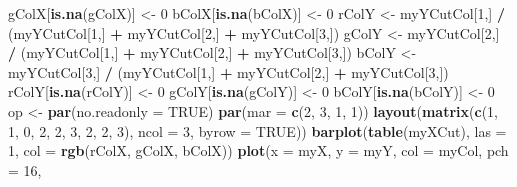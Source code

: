 \documentclass[]{book}
\newenvironment{Shaded}{\begin{snugshade}}{\end{snugshade}}
\newcommand{\KeywordTok}[1]{\textcolor[rgb]{0.13,0.29,0.53}{\textbf{#1}}}
\newcommand{\DataTypeTok}[1]{\textcolor[rgb]{0.13,0.29,0.53}{#1}}
\newcommand{\DecValTok}[1]{\textcolor[rgb]{0.00,0.00,0.81}{#1}}
\newcommand{\StringTok}[1]{\textcolor[rgb]{0.31,0.60,0.02}{#1}}
\newcommand{\OtherTok}[1]{\textcolor[rgb]{0.56,0.35,0.01}{#1}}
\newcommand{\OperatorTok}[1]{\textcolor[rgb]{0.81,0.36,0.00}{\textbf{#1}}}
\newcommand{\NormalTok}[1]{#1}
\theoremstyle{definition}
\theoremstyle{definition}
\theoremstyle{definition}
\theoremstyle{remark}
\begin{document}
\begin{Shaded}
\begin{Highlighting}[]
\NormalTok{  gColX[}\KeywordTok{is.na}\NormalTok{(gColX)] <-}\StringTok{ }\DecValTok{0}
\NormalTok{  bColX[}\KeywordTok{is.na}\NormalTok{(bColX)] <-}\StringTok{ }\DecValTok{0}
\NormalTok{  rColY <-}\StringTok{ }\NormalTok{myYCutCol[}\DecValTok{1}\NormalTok{,] }\OperatorTok{/}\StringTok{ }\NormalTok{(myYCutCol[}\DecValTok{1}\NormalTok{,] }\OperatorTok{+}\StringTok{ }\NormalTok{myYCutCol[}\DecValTok{2}\NormalTok{,] }\OperatorTok{+}\StringTok{ }
\StringTok{    }\NormalTok{myYCutCol[}\DecValTok{3}\NormalTok{,])}
\NormalTok{  gColY <-}\StringTok{ }\NormalTok{myYCutCol[}\DecValTok{2}\NormalTok{,] }\OperatorTok{/}\StringTok{ }\NormalTok{(myYCutCol[}\DecValTok{1}\NormalTok{,] }\OperatorTok{+}\StringTok{ }\NormalTok{myYCutCol[}\DecValTok{2}\NormalTok{,] }\OperatorTok{+}\StringTok{ }
\StringTok{    }\NormalTok{myYCutCol[}\DecValTok{3}\NormalTok{,])}
\NormalTok{  bColY <-}\StringTok{ }\NormalTok{myYCutCol[}\DecValTok{3}\NormalTok{,] }\OperatorTok{/}\StringTok{ }\NormalTok{(myYCutCol[}\DecValTok{1}\NormalTok{,] }\OperatorTok{+}\StringTok{ }\NormalTok{myYCutCol[}\DecValTok{2}\NormalTok{,] }\OperatorTok{+}\StringTok{ }
\StringTok{    }\NormalTok{myYCutCol[}\DecValTok{3}\NormalTok{,])}
\NormalTok{  rColY[}\KeywordTok{is.na}\NormalTok{(rColY)] <-}\StringTok{ }\DecValTok{0}
\NormalTok{  gColY[}\KeywordTok{is.na}\NormalTok{(gColY)] <-}\StringTok{ }\DecValTok{0}
\NormalTok{  bColY[}\KeywordTok{is.na}\NormalTok{(bColY)] <-}\StringTok{ }\DecValTok{0}
\NormalTok{  op <-}\StringTok{ }\KeywordTok{par}\NormalTok{(}\DataTypeTok{no.readonly =} \OtherTok{TRUE}\NormalTok{)}
  \KeywordTok{par}\NormalTok{(}\DataTypeTok{mar =} \KeywordTok{c}\NormalTok{(}\DecValTok{2}\NormalTok{, }\DecValTok{3}\NormalTok{, }\DecValTok{1}\NormalTok{, }\DecValTok{1}\NormalTok{))}
  \KeywordTok{layout}\NormalTok{(}\KeywordTok{matrix}\NormalTok{(}\KeywordTok{c}\NormalTok{(}\DecValTok{1}\NormalTok{, }\DecValTok{1}\NormalTok{, }\DecValTok{0}\NormalTok{, }
                  \DecValTok{2}\NormalTok{, }\DecValTok{2}\NormalTok{, }\DecValTok{3}\NormalTok{, }
                  \DecValTok{2}\NormalTok{, }\DecValTok{2}\NormalTok{, }\DecValTok{3}\NormalTok{), }\DataTypeTok{ncol =} \DecValTok{3}\NormalTok{, }\DataTypeTok{byrow =} \OtherTok{TRUE}\NormalTok{))}
  \KeywordTok{barplot}\NormalTok{(}\KeywordTok{table}\NormalTok{(myXCut), }\DataTypeTok{las =} \DecValTok{1}\NormalTok{, }\DataTypeTok{col =} \KeywordTok{rgb}\NormalTok{(rColX, gColX, bColX))}
  \KeywordTok{plot}\NormalTok{(}\DataTypeTok{x =}\NormalTok{ myX, }\DataTypeTok{y =}\NormalTok{ myY, }\DataTypeTok{col =}\NormalTok{ myCol, }\DataTypeTok{pch =} \DecValTok{16}\NormalTok{, }

\end{Highlighting}
\end{Shaded}
\end{document}
